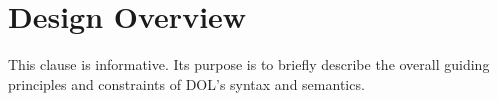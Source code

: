 \documentclass[10pt,fleqn,%
\ifpretendfinal
final%
\else
draft%
\fi,
]{scrreprt}
\makeatletter
\newcommand*\CommentAuthor{}
\renewcommand*\CommentAuthor{#1}}
\newcommand*\CommentDate{}
\renewcommand*\CommentDate{#1}}
\newcommand*\CommentId{}
\renewcommand*\CommentId{#1}}
\newcommand*\CommentType{}
\renewcommand*\CommentType{#1}}
\newcommand*{\SetCommentColorByType}[1]{%
\edef\localType{{#1}}%
\expandafter\ifstrequal\localType{q-aut}{\colorlet{CommentColor}{red}}{%
\expandafter\ifstrequal\localType{q-all}{\colorlet{CommentColor}{orange}}{%
\expandafter\ifstrequal\localType{todo}{\colorlet{CommentColor}{orange}}{%
\expandafter\ifstrequal\localType{fyi}{\colorlet{CommentColor}{lightgray}}{%
\colorlet{CommentColor}{yellow}}}}}}
\newcommand*{\SetCommentPrefixByType}[1]{%
\edef\localType{{#1}}%
\expandafter\@ifmtarg\localType{%
\edef\CommentPrefix{}%
}{%
\caseupper[q]{#1}%
\edef\CommentPrefix{\thestring: }%
}}
\newcommand*{\initComment}[1]{%
\setkeys{Comment}{#1}%
\SetCommentColorByType{\CommentType}%
\relax%
\SetCommentPrefixByType{\CommentType}%
\relax%
}
\newcommand*{\todonote}[2][]{%
\initComment{#1}%
\pdfcomment[author=\CommentAuthor,color=CommentColor,date=\CommentDate,id=\CommentId]{%
\CommentPrefix
#2}}
\renewcommand*{\todonote}[2][]{%
\initComment{#1}%
\ednote{\CommentPrefix #2}}
\newcommand*{\CLnote}[2][author=Christoph Lange]{%
\todonote[author=Christoph Lange,#1]{#2} 
}
\newcommand*{\shall}{\textbf{shall}\xspace}
\newcommand*{\should}{\textbf{should}\xspace}
\newcommand*{\IS}{OMG Specification\xspace}
\makeatother
\begin{document}
\chapter{Design Overview} \label{c:design}
%
%
%
%
This clause is informative. Its purpose is to briefly describe the 
 overall guiding principles and constraints of DOL's syntax and semantics.
%
%
%
%
%
%
%
\end{document}
